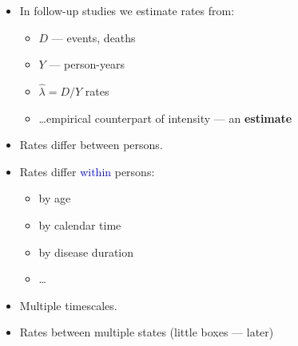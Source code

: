 

\begin{frame}[fragile]%
  \begin{itemize}[<+->]
  \item In follow-up studies we estimate rates from:

    \begin{itemize}[<+->]
    \item $D$ --- events, deaths
    \item $Y$ --- person-years
    \item $\hat\lambda = D/Y$ rates
    \item \ldots empirical counterpart of intensity --- an \textbf{estimate}
    \end{itemize}

  \item Rates differ between persons.
  \item Rates differ \textcolor{blue}{within} persons:

    \begin{itemize}[<+->]
    \item by age
    \item by calendar time
    \item by disease duration
    \item \ldots
    \end{itemize}

  \item Multiple timescales.
  \item Rates between multiple states (little boxes --- later)
  \end{itemize}

\end{frame}




